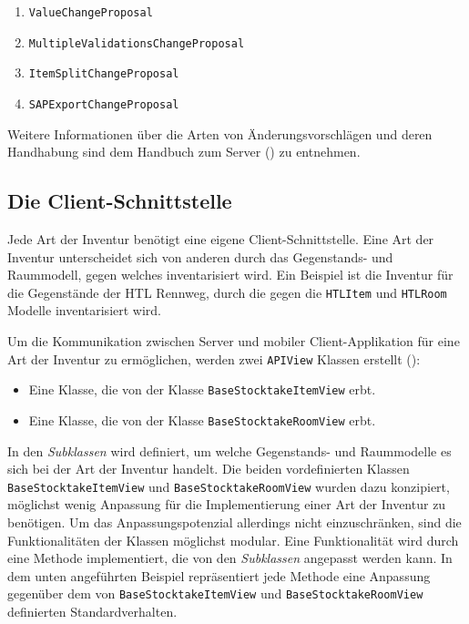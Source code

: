 \begin{enumerate}
\def\labelenumi{\arabic{enumi}.}
\tightlist
\item
  \texttt{ValueChangeProposal}
\item
  \texttt{MultipleValidationsChangeProposal}
\item
  \texttt{ItemSplitChangeProposal}
\item
  \texttt{SAPExportChangeProposal}
\end{enumerate}

Weitere Informationen über die Arten von Änderungsvorschlägen und deren
Handhabung sind dem Handbuch zum Server () zu
entnehmen.

\hypertarget{die-client-schnittstelle}{%
\subsection{Die Client-Schnittstelle}\label{die-client-schnittstelle}}

Jede Art der Inventur benötigt eine eigene Client-Schnittstelle. Eine
Art der Inventur unterscheidet sich von anderen durch das Gegenstands-
und Raummodell, gegen welches inventarisiert wird. Ein Beispiel ist die
Inventur für die Gegenstände der HTL Rennweg, durch die gegen die
\texttt{HTLItem} und \texttt{HTLRoom} Modelle inventarisiert wird.

Um die Kommunikation zwischen Server und mobiler Client-Applikation für
eine Art der Inventur zu ermöglichen, werden zwei \texttt{APIView}
Klassen erstellt ():

\begin{itemize}
\tightlist
\item
  Eine Klasse, die von der Klasse \texttt{BaseStocktakeItemView} erbt.
\item
  Eine Klasse, die von der Klasse \texttt{BaseStocktakeRoomView} erbt.
\end{itemize}

In den
\emph{Subklassen}
wird \ua{} definiert, um welche Gegenstands- und Raummodelle es sich bei
der Art der Inventur handelt. Die beiden vordefinierten Klassen
\texttt{BaseStocktakeItemView} und \texttt{BaseStocktakeRoomView} wurden
dazu konzipiert, möglichst wenig Anpassung für die Implementierung einer
Art der Inventur zu benötigen. Um das Anpassungspotenzial allerdings
nicht einzuschränken, sind die Funktionalitäten der Klassen möglichst
modular. Eine Funktionalität wird durch eine Methode implementiert, die
von den
\emph{Subklassen}
angepasst werden kann. In dem unten angeführten Beispiel repräsentiert
jede Methode eine Anpassung gegenüber dem von
\texttt{BaseStocktakeItemView} und \texttt{BaseStocktakeRoomView}
definierten Standardverhalten.

